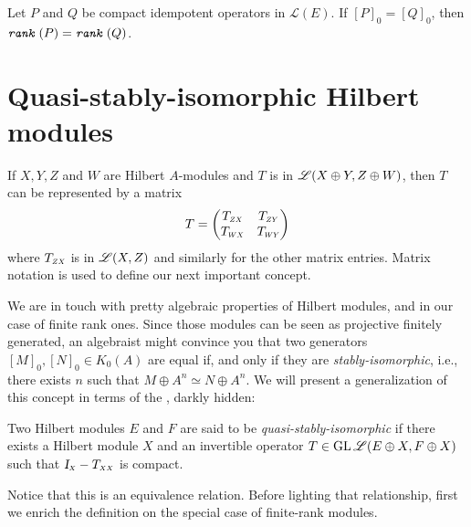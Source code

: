\begin{corolario}
    \label{corol: [P]_0 =[Q]_0 ---> rank(P) = rank(Q)}
    Let $P$ and $Q$ be compact idempotent operators in $\mathscr L(E)$. If $[P]_0 = [Q]_0$, then $\texttt{\textit{rank}}\,(P) = \texttt{\textit{rank}}\,(Q)$.
\end{corolario}


\section{Quasi-stably-isomorphic Hilbert modules}

If $X, Y, Z$ and $W$ are Hilbert $A$-modules and $T$ is in $\mathscr L(X \oplus Y, Z \oplus W)$, then $T$ can be represented by a matrix
$$
T=\begin{pmatrix}
\sub{T}{Z X} & \sub{T}{Z Y} \\
\sub{T}{W X} & \sub{T}{W Y}
\end{pmatrix}
$$
where $\sub{T}{Z X}$ is in $\mathscr L(X, Z)$ and similarly for the other matrix entries. Matrix notation is used to define our next important concept.

We are in touch with pretty algebraic properties of Hilbert modules, and in our case of finite rank ones. Since those modules can be seen as projective finitely generated, an algebraist might convince you that two generators $[M]_0,[N]_0 \in K_0(A)$ are equal if, and only if they are \textit{stably-isomorphic}, i.e., there exists $n$ such that $ M \oplus A^n \simeq N \oplus A^n$. We will present a generalization of this concept in terms of the \rank, darkly hidden:

\begin{definicao}
\label{def: quasi-stabli-isomorphic}
Two Hilbert modules $E$ and $F$ are said to be \textit{quasi-stably-isomorphic} if there exists a Hilbert module $X$ and an invertible operator $T \in \operatorname{GL} \mathscr L(E \oplus X, F \oplus X)$ such that $\sub{\Id}{X}-\sub T{X X}$ is compact.
\end{definicao}

Notice that this is an equivalence relation. Before lighting that relationship, first we enrich the definition on the special case of finite-rank modules.

